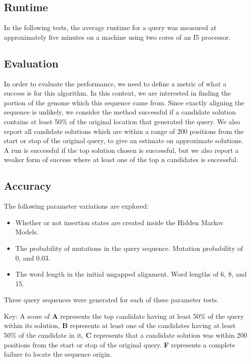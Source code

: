 \documentclass[12pt, conference]{IEEEtran}
\begin{document}
\subsection{\textbf{Runtime}}

	In the following tests, the average runtime for a query was measured at approximately five minutes on a machine using two cores of an I5 processor.

\subsection{\textbf{Evaluation}}

	In order to evaluate the performance, we need to define a metric of what a success is for this algorithm. In this context, we are interested in finding the portion of the genome which this sequence came from. Since exactly aligning the sequence is unlikely, we consider the method successful if a candidate solution contains at least 50\% of the original location that generated the query. We also report all candidate solutions which are within a range of 200 positions from the start or stop of the original query, to give an estimate on approximate solutions. A run is successful if the top solution chosen is successful, but we also report a weaker form of success where at least one of the top n candidates is successful.
	
\subsection{\textbf{Accuracy}}

	The following parameter variations are explored:
	\begin{itemize}
	\item Whether or not insertion states are created inside the Hidden Markov Models.
	\item The probability of mutations in the query sequence. Mutation probability of 0, and 0.03.
	\item The word length in the initial ungapped alignment. Word lengths of 6, 8, and 15.
	\end{itemize}
	
	Three query sequences were generated for each of these parameter tests.
	
	Key: A score of \textbf{A} represents the top candidate having at least 50\% of the query within its solution, \textbf{B} represents at least one of the candidates having at least 50\% of the candidate in it, \textbf{C} represents that a candidate solution was within 200 positions from the start or stop of the original query. \textbf{F} represents a complete failure to locate the sequence origin.
	
\end{document}
